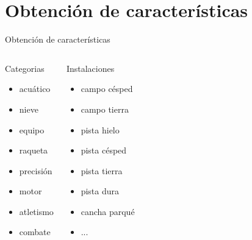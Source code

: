 \section{Obtención de características}
\begin{frame}
\end{frame}

\begin{frame}{Obtención de características}
 \begin{columns}[t]
  \begin{block}{Categorias}
   	\begin{itemize}
	\item acuático
	\item nieve
	\item equipo
	\item raqueta
	\item precisión
	\item motor
	\item atletismo
	\item combate
	\end{itemize}
  \end{block}
  \begin{block}{Instalaciones}
  	\begin{itemize}
	\item campo césped
	\item campo tierra
	\item pista hielo
	\item pista césped
	\item pista tierra
	\item pista dura
	\item cancha parqué
	\item ...
	\end{itemize}
  \end{block}
 \end{columns}
\end{frame}

